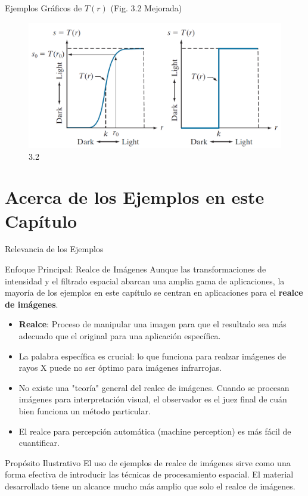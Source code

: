 \documentclass{beamer}
\begin{document}
\begin{frame}{Ejemplos Gráficos de $T(r)$ (Fig. 3.2 Mejorada)}
    \begin{figure}
        \centering
        \includegraphics[width=0.8\linewidth]{figuras/Fig_3_2.png}
        \caption{3.2}
    \end{figure}
\end{frame}

\section{Acerca de los Ejemplos en este Capítulo}

\begin{frame}\footnotesize{{Relevancia de los Ejemplos}
    \begin{alertblock}{Enfoque Principal: Realce de Imágenes}
        Aunque las transformaciones de intensidad y el filtrado espacial abarcan una amplia gama de aplicaciones, la mayoría de los ejemplos en este capítulo se centran en aplicaciones para el \textbf{realce de imágenes}.
    \end{alertblock}
    \begin{itemize}
        \item \textbf{Realce}: Proceso de manipular una imagen para que el resultado sea más adecuado que el original para una aplicación específica.
        \item La palabra específica es crucial: lo que funciona para realzar imágenes de rayos X puede no ser óptimo para imágenes infrarrojas.
        \item No existe una "teoría" general del realce de imágenes. Cuando se procesan imágenes para interpretación visual, el observador es el juez final de cuán bien funciona un método particular.
        \item El realce para percepción automática (machine perception) es más fácil de cuantificar.
    \end{itemize}
    \begin{exampleblock}{Propósito Ilustrativo}
    El uso de ejemplos de realce de imágenes sirve como una forma efectiva de introducir las técnicas de procesamiento espacial. El material desarrollado tiene un alcance mucho más amplio que solo el realce de imágenes.
    \end{exampleblock}}
\end{frame}
\end{document}
